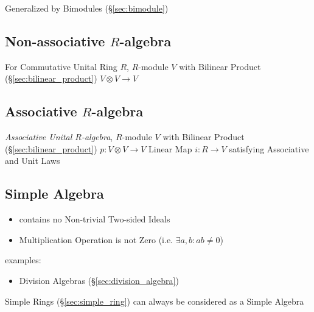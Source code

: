Generalized by Bimodules (\S\ref{sec:bimodule})



\subsection{Non-associative $R$-algebra}
\label{sec:nonassociative_r_algebra}

For Commutative Unital Ring $R$, $R$-module $V$ with Bilinear Product
(\S\ref{sec:bilinear_product}) $V \otimes V \rightarrow V$



\subsection{Associative $R$-algebra}\label{sec:associative_r_algebra}

\emph{Associative Unital $R$-algebra}, $R$-module $V$ with Bilinear
Product (\S\ref{sec:bilinear_product}) $p : V \otimes V \rightarrow V$
Linear Map $i : R \rightarrow V$ satisfying Associative and Unit Laws



\subsection{Simple Algebra}\label{sec:simple_algebra}

\begin{itemize}
  \item contains no Non-trivial Two-sided Ideals
  \item Multiplication Operation is not Zero (i.e. $\exists a, b : ab \neq 0$)
\end{itemize}

examples:
\begin{itemize}
  \item Division Algebras (\S\ref{sec:division_algebra})
\end{itemize}

Simple Rings (\S\ref{sec:simple_ring}) can always be considered as a Simple
Algebra



